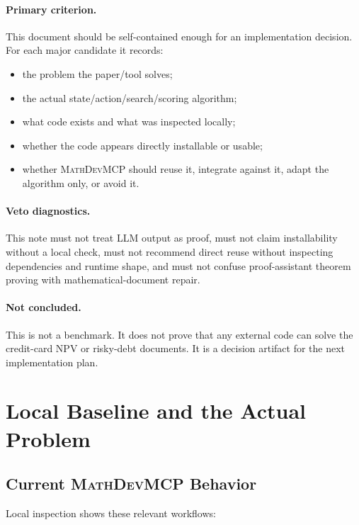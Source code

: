 \documentclass[11pt]{article}
\newcommand{\MathDevMCP}{\textsc{MathDevMCP}}
\newcommand{\LLM}{\textsc{LLM}}
\begin{document}
\paragraph{Primary criterion.}
This document should be self-contained enough for an implementation decision.
For each major candidate it records:

\begin{itemize}[leftmargin=*]
\item the problem the paper/tool solves;
\item the actual state/action/search/scoring algorithm;
\item what code exists and what was inspected locally;
\item whether the code appears directly installable or usable;
\item whether \MathDevMCP{} should reuse it, integrate against it, adapt the
  algorithm only, or avoid it.
\end{itemize}

\paragraph{Veto diagnostics.}
This note must not treat \LLM{} output as proof, must not claim installability
without a local check, must not recommend direct reuse without inspecting
dependencies and runtime shape, and must not confuse proof-assistant theorem
proving with mathematical-document repair.

\paragraph{Not concluded.}
This is not a benchmark. It does not prove that any external code can solve the
credit-card NPV or risky-debt documents. It is a decision artifact for the next
implementation plan.

\section{Local Baseline and the Actual Problem}

\subsection{Current \MathDevMCP{} Behavior}

Local inspection shows these relevant workflows:
\end{document}
